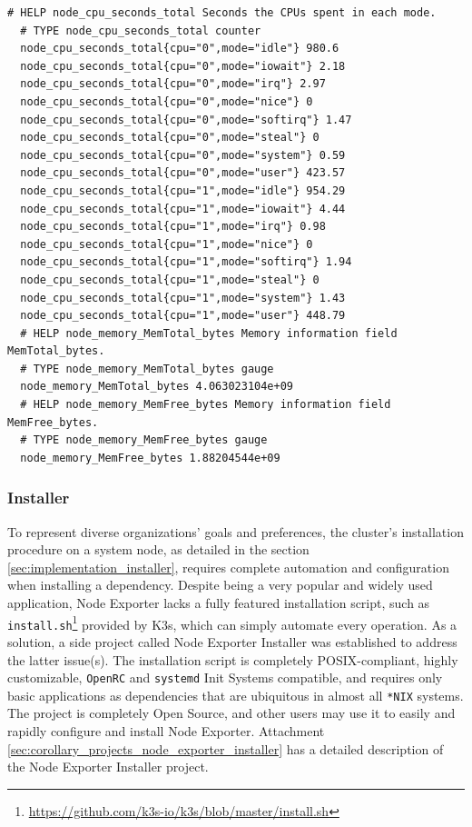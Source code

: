\begin{lstlisting}[language=prometheus, xleftmargin=\parindent, alsoletter={_}, morekeywords={node_cpu_seconds_total, node_memory_MemTotal_bytes, node_memory_MemFree_bytes}, morekeywords={[2]{cpu, mode}}, label={lst:node_exporter}, caption=Example section of a Node Exporter response with \texttt{cpu} and \texttt{meminfo} collectors enabled]
  # HELP node_cpu_seconds_total Seconds the CPUs spent in each mode.
  # TYPE node_cpu_seconds_total counter
  node_cpu_seconds_total{cpu="0",mode="idle"} 980.6
  node_cpu_seconds_total{cpu="0",mode="iowait"} 2.18
  node_cpu_seconds_total{cpu="0",mode="irq"} 2.97
  node_cpu_seconds_total{cpu="0",mode="nice"} 0
  node_cpu_seconds_total{cpu="0",mode="softirq"} 1.47
  node_cpu_seconds_total{cpu="0",mode="steal"} 0
  node_cpu_seconds_total{cpu="0",mode="system"} 0.59
  node_cpu_seconds_total{cpu="0",mode="user"} 423.57
  node_cpu_seconds_total{cpu="1",mode="idle"} 954.29
  node_cpu_seconds_total{cpu="1",mode="iowait"} 4.44
  node_cpu_seconds_total{cpu="1",mode="irq"} 0.98
  node_cpu_seconds_total{cpu="1",mode="nice"} 0
  node_cpu_seconds_total{cpu="1",mode="softirq"} 1.94
  node_cpu_seconds_total{cpu="1",mode="steal"} 0
  node_cpu_seconds_total{cpu="1",mode="system"} 1.43
  node_cpu_seconds_total{cpu="1",mode="user"} 448.79
  # HELP node_memory_MemTotal_bytes Memory information field MemTotal_bytes.
  # TYPE node_memory_MemTotal_bytes gauge
  node_memory_MemTotal_bytes 4.063023104e+09
  # HELP node_memory_MemFree_bytes Memory information field MemFree_bytes.
  # TYPE node_memory_MemFree_bytes gauge
  node_memory_MemFree_bytes 1.88204544e+09
\end{lstlisting}

\subsubsection{Installer}
\label{subsubsec:implementation_dependencies_node_exporter_installer}

To represent diverse organizations' goals and preferences, the cluster's installation
procedure on a system node, as detailed in the section
\ref{sec:implementation_installer}, requires complete automation and configuration
when installing a dependency. Despite being a very popular and widely used
application, Node Exporter lacks a fully featured installation script, such as
\texttt{install.sh}\footnote{\url{https://github.com/k3s-io/k3s/blob/master/install.sh}}
provided by K3s, which can simply automate every operation. As a solution, a
side project called Node Exporter Installer was established to address the
latter issue(s). The installation script is completely POSIX-compliant, highly customizable,
\texttt{OpenRC} and \texttt{systemd} Init Systems compatible, and requires only basic
applications as dependencies that are ubiquitous in almost all \texttt{*NIX} systems.
The project is completely Open Source, and other users may use it to easily and rapidly
configure and install Node Exporter. Attachment
\ref{sec:corollary_projects_node_exporter_installer} has a detailed description
of the Node Exporter Installer project.


